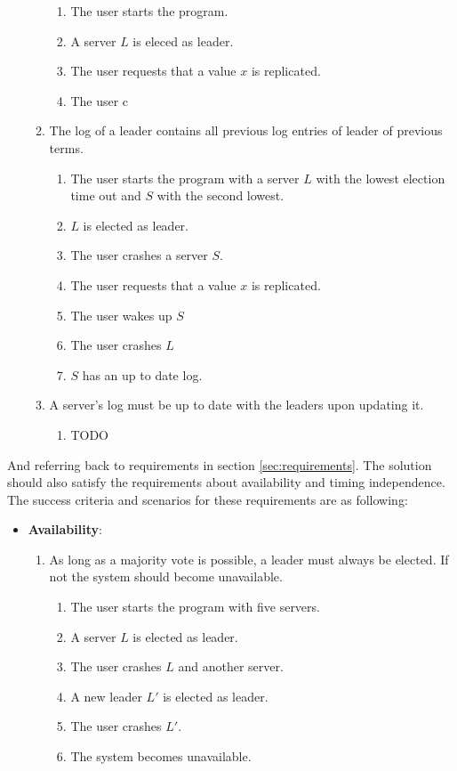 \begin{itemize}
\begin{enumerate}
\begin{enumerate}
        \item The user starts the program.
        \item A server $L$ is eleced as leader.
        \item The user requests that a value $x$ is replicated.
        \item The user c
        \end{enumerate}
    \item The log of a leader contains all previous log entries of leader of previous terms.
        \begin{enumerate}
        \item The user starts the program with a server $L$ with the lowest election time out and $S$ with the second lowest.
        \item $L$ is elected as leader.
        \item The user crashes a server $S$.
        \item The user requests that a value $x$ is replicated.
        \item The user wakes up $S$
        \item The user crashes $L$
        \item $S$ has an up to date log.
        \end{enumerate}
    \item A server's log must be up to date with the leaders upon updating it.
        \begin{enumerate}
        \item TODO
        \end{enumerate}
    \end{enumerate}
\end{itemize}
And referring back to requirements in section \ref{sec:requirements}. The solution should also satisfy the requirements about availability and timing independence. The success criteria and scenarios for these requirements are as following:
\begin{itemize}
\item \textbf{Availability}:
    \begin{enumerate}
    \item As long as a majority vote is possible, a leader must always be elected. If not the system should become unavailable.
        \begin{enumerate}
        \item The user starts the program with five servers.
        \item A server $L$ is elected as leader.
        \item The user crashes $L$ and another server.
        \item A new leader $L'$ is elected as leader.
        \item The user crashes $L'$.
        \item The system becomes unavailable.
        \end{enumerate}
    \end{enumerate}
\end{itemize}
